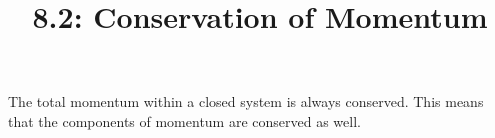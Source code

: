 \documentclass{article}
\title{8.2: Conservation of Momentum}
\begin{document}
\maketitle
\begin{theorem}
The total momentum within a closed system is always conserved. This means that the components of momentum are conserved as well. 
\end{theorem}
\end{document}

